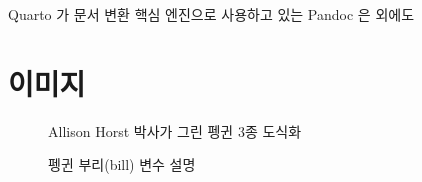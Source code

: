 \documentclass[
  a4paper,
]{report}
\begin{document}
Quarto 가 문서 변환 핵심 엔진으로 사용하고 있는 Pandoc 은 \LaTex 외에도

\hypertarget{uxc774uxbbf8uxc9c0}{%
\chapter{이미지}\label{uxc774uxbbf8uxc9c0}}

\begin{figure}

\begin{minipage}[t]{0.50\linewidth}

{\centering 


\caption{\label{fig-penguins}Allison Horst 박사가 그린 펭귄 3종 도식화}

}

\end{minipage}%
%
\begin{minipage}[t]{0.50\linewidth}

{\centering 


\caption{\label{fig-bill}펭귄 부리(bill) 변수 설명}

}

\end{minipage}%

\end{figure}
\end{document}
